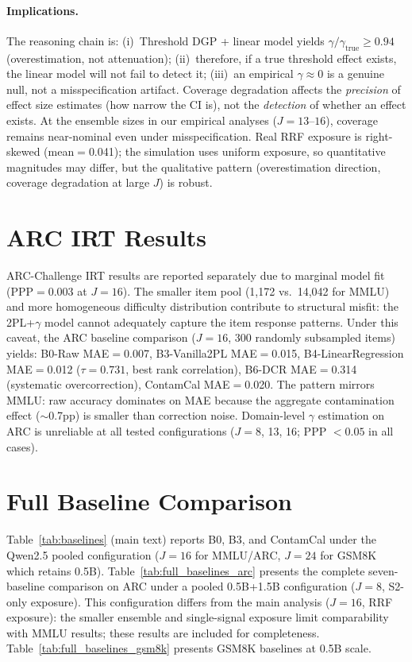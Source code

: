 \paragraph{Implications.} The reasoning chain is: (i)~Threshold DGP + linear model yields $\hat{\gamma}/\gamma_{\text{true}} \geq 0.94$ (overestimation, not attenuation); (ii)~therefore, if a true threshold effect exists, the linear model will not fail to detect it; (iii)~an empirical $\gamma \approx 0$ is a genuine null, not a misspecification artifact. Coverage degradation affects the \emph{precision} of effect size estimates (how narrow the CI is), not the \emph{detection} of whether an effect exists. At the ensemble sizes in our empirical analyses ($J\!=\!13$--$16$), coverage remains near-nominal even under misspecification. Real RRF exposure is right-skewed (mean$=$0.041); the simulation uses uniform exposure, so quantitative magnitudes may differ, but the qualitative pattern (overestimation direction, coverage degradation at large $J$) is robust.

\section{ARC IRT Results}
\label{sec:arc_irt}

ARC-Challenge IRT results are reported separately due to marginal model fit (PPP$=$0.003 at $J=16$). The smaller item pool (1,172 vs.\ 14,042 for MMLU) and more homogeneous difficulty distribution contribute to structural misfit: the 2PL+$\gamma$ model cannot adequately capture the item response patterns. Under this caveat, the ARC baseline comparison ($J=16$, 300 randomly subsampled items) yields: B0-Raw MAE$=$0.007, B3-Vanilla2PL MAE$=$0.015, B4-LinearRegression MAE$=$0.012 ($\tau = 0.731$, best rank correlation), B6-DCR MAE$=$0.314 (systematic overcorrection), ContamCal MAE$=$0.020. The pattern mirrors MMLU: raw accuracy dominates on MAE because the aggregate contamination effect (${\sim}$0.7pp) is smaller than correction noise. Domain-level $\gamma$ estimation on ARC is unreliable at all tested configurations ($J=8$, 13, 16; PPP $< 0.05$ in all cases).

\section{Full Baseline Comparison}
\label{sec:full_baselines}

Table~\ref{tab:baselines} (main text) reports B0, B3, and ContamCal under the Qwen2.5 pooled configuration ($J=16$ for MMLU/ARC, $J=24$ for GSM8K which retains 0.5B). Table~\ref{tab:full_baselines_arc} presents the complete seven-baseline comparison on ARC under a pooled 0.5B+1.5B configuration ($J=8$, S2-only exposure). This configuration differs from the main analysis ($J=16$, RRF exposure): the smaller ensemble and single-signal exposure limit comparability with MMLU results; these results are included for completeness. Table~\ref{tab:full_baselines_gsm8k} presents GSM8K baselines at 0.5B scale.

